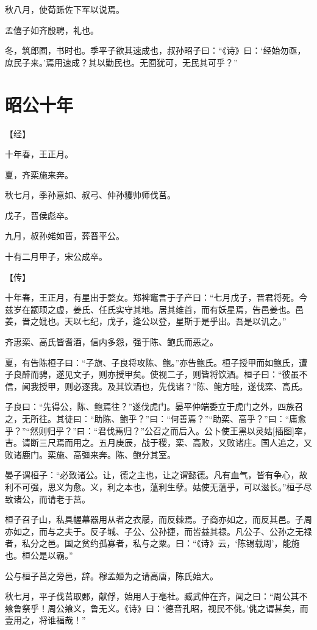 \documentclass[a4paper,12pt,UTF8,twoside]{ctexbook}
\begin{document}
秋八月，使荀跞佐下军以说焉。

孟僖子如齐殷聘，礼也。

冬，筑郎囿，书时也。季平子欲其速成也，叔孙昭子曰：“《诗》曰：‘经始勿亟，庶民子来。’焉用速成？其以勦民也。无囿犹可，无民其可乎？”

\section{昭公十年}



【经】

十年春，王正月。

夏，齐栾施来奔。

秋七月，季孙意如、叔弓、仲孙貜帅师伐莒。

戊子，晋侯彪卒。

九月，叔孙婼如晋，葬晋平公。

十有二月甲子，宋公成卒。

【传】

十年春，王正月，有星出于婺女。郑裨竈言于子产曰：“七月戊子，晋君将死。今兹岁在颛顼之虚，姜氏、任氏实守其地。居其维首，而有妖星焉，告邑姜也。邑姜，晋之妣也。天以七纪，戊子，逢公以登，星斯于是乎出。吾是以讥之。”

齐惠栾、高氏皆耆酒，信内多怨，强于陈、鲍氏而恶之。

夏，有告陈桓子曰：“子旗、子良将攻陈、鲍。”亦告鲍氏。桓子授甲而如鲍氏，遭子良醉而骋，遂见文子，则亦授甲矣。使视二子，则皆将饮酒。桓子曰：“彼虽不信，闻我授甲，则必逐我。及其饮酒也，先伐诸？”陈、鲍方睦，遂伐栾、高氏。

子良曰：“先得公，陈、鲍焉往？”遂伐虎门。晏平仲端委立于虎门之外，四族召之，无所往。其徒曰：“助陈、鲍乎？”曰：“何善焉？”“助栾、高乎？”曰：“庸愈乎？”“然则归乎？”曰：“君伐焉归？”公召之而后入。公卜使王黑以灵姑[插图]率，吉。请断三尺焉而用之。五月庚辰，战于稷，栾、高败，又败诸庄。国人追之，又败诸鹿门。栾施、高彊来奔。陈、鲍分其室。

晏子谓桓子：“必致诸公。让，德之主也，让之谓懿德。凡有血气，皆有争心，故利不可强，思义为愈。义，利之本也，蕰利生孽。姑使无蕰乎，可以滋长。”桓子尽致诸公，而请老于莒。

桓子召子山，私具幄幕器用从者之衣屦，而反棘焉。子商亦如之，而反其邑。子周亦如之，而与之夫于。反子城、子公、公孙捷，而皆益其禄。凡公子、公孙之无禄者，私分之邑。国之贫约孤寡者，私与之粟。曰：“《诗》云，‘陈锡载周’，能施也。桓公是以霸。”

公与桓子莒之旁邑，辞。穆孟姬为之请高唐，陈氏始大。

秋七月，平子伐莒取郠，献俘，始用人于亳社。臧武仲在齐，闻之曰：“周公其不飨鲁祭乎！周公飨义，鲁无义。《诗》曰：‘德音孔昭，视民不佻。’佻之谓甚矣，而壹用之，将谁福哉！”
\end{document}
